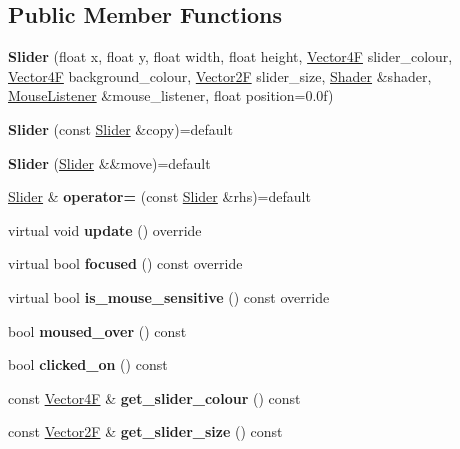 \subsection*{Public Member Functions}
\begin{DoxyCompactItemize}
\item 
\mbox{\label{class_slider_ad9bceb3f462c084a91bfe910065fe94f}} 
{\bfseries Slider} (float x, float y, float width, float height, \mbox{\hyperlink{class_vector4}{Vector4F}} slider\+\_\+colour, \mbox{\hyperlink{class_vector4}{Vector4F}} background\+\_\+colour, \mbox{\hyperlink{class_vector2}{Vector2F}} slider\+\_\+size, \mbox{\hyperlink{class_shader}{Shader}} \&shader, \mbox{\hyperlink{class_mouse_listener}{Mouse\+Listener}} \&mouse\+\_\+listener, float position=0.\+0f)
\item 
\mbox{\label{class_slider_ad851df3ece70a37975688103f3a59654}} 
{\bfseries Slider} (const \mbox{\hyperlink{class_slider}{Slider}} \&copy)=default
\item 
\mbox{\label{class_slider_a25af94943d056f9378a950e490c297d7}} 
{\bfseries Slider} (\mbox{\hyperlink{class_slider}{Slider}} \&\&move)=default
\item 
\mbox{\label{class_slider_ad5169f896e16ce9278171ee78cc9d493}} 
\mbox{\hyperlink{class_slider}{Slider}} \& {\bfseries operator=} (const \mbox{\hyperlink{class_slider}{Slider}} \&rhs)=default
\item 
\mbox{\label{class_slider_a4ebd527db54ea263c7d0efe4d1f94e1b}} 
virtual void {\bfseries update} () override
\item 
\mbox{\label{class_slider_a30b01348a5d214f3078e22516c60a763}} 
virtual bool {\bfseries focused} () const override
\item 
\mbox{\label{class_slider_a8d7d12aa4bc5d26de46790b43116bcc1}} 
virtual bool {\bfseries is\+\_\+mouse\+\_\+sensitive} () const override
\item 
\mbox{\label{class_slider_a736d0f12de097fa94f1b1b718f4f76a7}} 
bool {\bfseries moused\+\_\+over} () const
\item 
\mbox{\label{class_slider_a59e849b069f0a02451e93a63884555c4}} 
bool {\bfseries clicked\+\_\+on} () const
\item 
\mbox{\label{class_slider_a660889686a2d0b9d73fb25cfb9eaff9a}} 
const \mbox{\hyperlink{class_vector4}{Vector4F}} \& {\bfseries get\+\_\+slider\+\_\+colour} () const
\item 
\mbox{\label{class_slider_a235e764dfafeacc678b77f5300f44dba}} 
const \mbox{\hyperlink{class_vector2}{Vector2F}} \& {\bfseries get\+\_\+slider\+\_\+size} () const
\end{DoxyCompactItemize}
